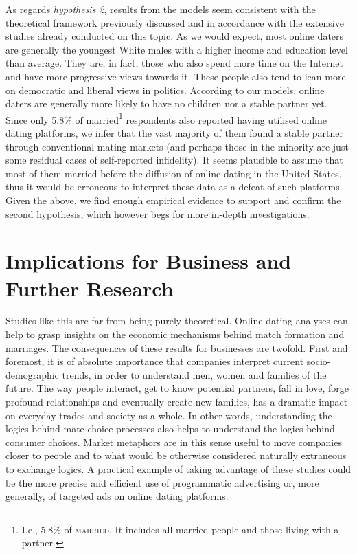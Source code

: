 As regards \textsl{hypothesis 2}, results from the models seem consistent
with the theoretical framework previously discussed and in accordance
with the extensive studies already conducted on this topic. As we
would expect, most online daters are generally the youngest White
males with a higher income and education level than average. They
are, in fact, those who also spend more time on the Internet and have
more progressive views towards it. These people also tend to lean
more on democratic and liberal views in politics. According to our
models, online daters are generally more likely to have no children
nor a stable partner yet. Since only 5.8\% of married\footnote{I.e., 5.8\% of \textsc{married}. It includes all married people and
those living with a partner. } respondents also reported having utilised online dating platforms,
we infer that the vast majority of them found a stable partner through
conventional mating markets (and perhaps those in the minority are
just some residual cases of self-reported infidelity). It seems plausible
to assume that most of them married before the diffusion of online
dating in the United States, thus it would be erroneous to interpret
these data as a defeat of such platforms. Given the above, we find
enough empirical evidence to support and confirm the second hypothesis,
which however begs for more in-depth investigations.


\section{Implications for Business and Further Research}

Studies like this are far from being purely theoretical. Online dating
analyses can help to grasp insights on the economic mechanisms behind
match formation and marriages. The consequences of these results for
businesses are twofold. First and foremost, it is of absolute importance
that companies interpret current socio-demographic trends, in order
to understand men, women and families of the future. The way people
interact, get to know potential partners, fall in love, forge profound
relationships and eventually create new families, has a dramatic impact
on everyday trades and society as a whole. In other words, understanding
the logics behind mate choice processes also helps to understand the
logics behind consumer choices. Market metaphors are in this sense
useful to move companies closer to people and to what would be otherwise
considered naturally extraneous to exchange logics. A practical example
of taking advantage of these studies could be the more precise and
efficient use of programmatic advertising or, more generally, of targeted
ads on online dating platforms. 

